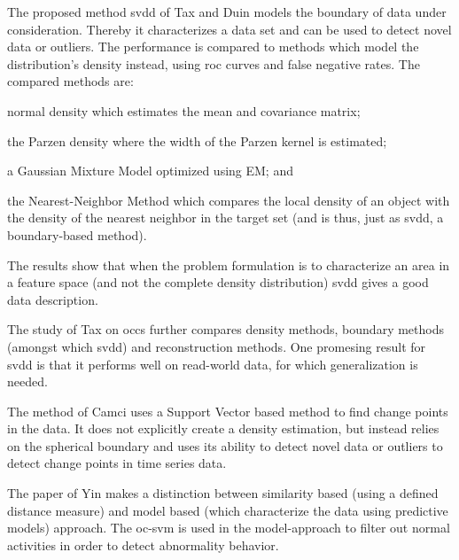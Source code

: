 The proposed method \gls{svdd} of Tax and Duin \cite{tax1999support, tax2004support} models the boundary of data under consideration.
Thereby it characterizes a data set and can be used to detect novel data or outliers.
The performance is compared to methods which model the distribution's density instead, using \gls{roc} curves and false negative rates.
The compared methods are:
\begin{inparaenum}[\itshape (1)]
  \item normal density which estimates the mean and covariance matrix;
  \item the Parzen density where the width of the Parzen kernel is estimated;
  \item a Gaussian Mixture Model optimized using EM; and
  \item the Nearest-Neighbor Method which compares the local density of an object with the density of the nearest neighbor in the target set (and is thus, just as \gls{svdd}, a boundary-based method).
\end{inparaenum}
The results show that when the problem formulation is to characterize an area in a feature space (and not the complete density distribution) \gls{svdd} gives a good data description.

The study of Tax on \glspl{occ} \cite{tax2001one} further compares density methods, boundary methods (amongst which \gls{svdd}) and reconstruction methods.
One promesing result for \gls{svdd} is that it performs well on read-world data, for which generalization is needed.

The method of Camci \cite{camci2010change} uses a Support Vector based method to find change points in the data.
It does not explicitly create a density estimation, but instead relies on the spherical boundary and uses its ability to detect novel data or outliers to detect change points in time series data.


The paper of Yin \etal \cite{yin2008sensor} makes a distinction between similarity based (using a defined distance measure) and model based (which characterize the data using predictive models) approach.
The \gls{oc-svm} is used in the model-approach to filter out normal activities in order to detect abnormality behavior.


